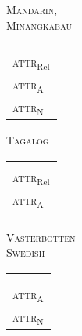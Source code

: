 \begin{figure} \label{multi abcd}
\parbox[b]{0.20\textwidth}{
\begin{center}\textsc{Mandarin},\\\textsc{Minangkabau}\\
\medskip
\begin{tabular}{| l |}
\hline
\\
\hline
\hline
\\
\hline
\textsc{attr}$_{\text{Rel}}$\\
\hline
\textsc{attr}$_{\text{A}}$\\
\hline
\textsc{attr}$_{\text{N}}$\\
\hline
\end{tabular}
\end{center}
}
\parbox[b]{0.20\textwidth}{
\begin{center}\textsc{Tagalog}\\
\bigskip
\begin{tabular}{| l |}
\hline
\\
\hline
\hline
\\
\hline
\textsc{attr}$_{\text{Rel}}$\\
\hline
\textsc{attr}$_{\text{A}}$\\
\hline
\\
\hline
\end{tabular}
\end{center}
}
\parbox[b]{0.20\textwidth}{
\begin{center}\textsc{Västerbotten }\\\textsc{Swedish}\\
\medskip
\begin{tabular}{| l |}
\hline
\\
\hline
\hline
\\
\hline
\\
\hline
\textsc{attr}$_{\text{A}}$\\
\hline
\textsc{attr}$_{\text{N}}$\\
\hline
\end{tabular}

\end{center}}
\end{figure}
